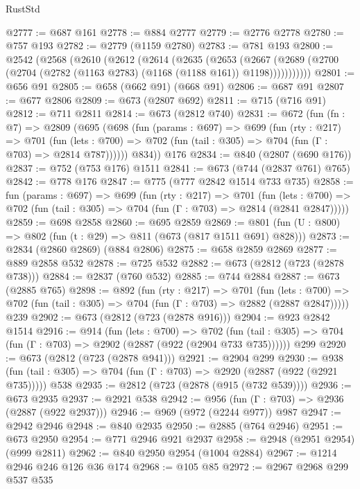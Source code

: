 \begin{lexlean}{RustStd}
\begin{coremodule}
@2777 := @687 @161
@2778 := @884 @2777
@2779 := @2776 @2778
@2780 := @757 @193
@2782 := @2779 (@1159 @2780)
@2783 := @781 @193
@2800 := @2542
    (@2568
      (@2610
        (@2612
          (@2614
            (@2635
              (@2653
                (@2667
                  (@2689 (@2700 (@2704 (@2782 (@1163 @2783) (@1168 (@1188 @161)) @1198)))))))))))
@2801 := @656 @91
@2805 := @658 (@662 @91) (@668 @91)
@2806 := @687 @91
@2807 := @677 @2806
@2809 := @673 (@2807 @692)
@2811 := @715 (@716 @91)
@2812 := @711 @2811
@2814 := @673 (@2812 @740)
@2831 := @672
    (fun (fn : @7) =>
    @2809
      (@695
        (@698
          (fun (params : @697) =>
          @699
            (fun (rty : @217) =>
            @701
              (fun (lets : @700) =>
              @702 (fun (tail : @305) => @704 (fun (Γ : @703) => @2814 @787))))))
        @834))
    @176
@2834 := @840 (@2807 (@690 @176))
@2837 := @752 (@753 @176) @1511
@2841 := @673 (@744 (@2837 @761) @765)
@2842 := @778 @176
@2847 := @775 (@777 @2842 @1514 @733 @735)
@2858 := fun (params : @697) =>
  @699
    (fun (rty : @217) =>
    @701
      (fun (lets : @700) =>
      @702 (fun (tail : @305) => @704 (fun (Γ : @703) => @2814 (@2841 @2847)))))
@2859 := @698 @2858
@2860 := @695 @2859
@2869 := @801 (fun (U : @800) => @802 (fun (t : @29) => @811 (@673 (@817 @1511 @691) @828)))
@2873 := @2834 (@2860 @2869) (@884 @2806)
@2875 := @658 @2859 @2869
@2877 := @889 @2858 @532
@2878 := @725 @532
@2882 := @673 (@2812 (@723 (@2878 @738)))
@2884 := @2837 (@760 @532)
@2885 := @744 @2884
@2887 := @673 (@2885 @765)
@2898 := @892
    (fun (rty : @217) =>
    @701
      (fun (lets : @700) =>
      @702 (fun (tail : @305) => @704 (fun (Γ : @703) => @2882 (@2887 @2847)))))
    @239
@2902 := @673 (@2812 (@723 (@2878 @916)))
@2904 := @923 @2842 @1514
@2916 := @914
    (fun (lets : @700) =>
    @702 (fun (tail : @305) => @704 (fun (Γ : @703) => @2902 (@2887 (@922 (@2904 @733 @735))))))
    @299
@2920 := @673 (@2812 (@723 (@2878 @941)))
@2921 := @2904 @299
@2930 := @938 (fun (tail : @305) => @704 (fun (Γ : @703) => @2920 (@2887 (@922 (@2921 @735))))) @538
@2935 := @2812 (@723 (@2878 (@915 (@732 @539))))
@2936 := @673 @2935
@2937 := @2921 @538
@2942 := @956 (fun (Γ : @703) => @2936 (@2887 (@922 @2937)))
@2946 := @969 (@972 (@2244 @977)) @987
@2947 := @2942 @2946
@2948 := @840 @2935
@2950 := @2885 (@764 @2946)
@2951 := @673 @2950
@2954 := @771 @2946 @921 @2937
@2958 := @2948 (@2951 @2954) (@999 @2811)
@2962 := @840 @2950 @2954 (@1004 @2884)
@2967 := @1214 @2946 @246 @126 @36 @174
@2968 := @105 @85
@2972 := @2967 @2968 @299 @537 @535

\end{coremodule}
\end{lexlean}
